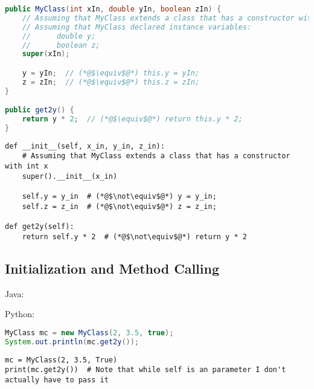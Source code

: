 \documentclass{article}
\begin{document}
\begin{minipage}{0.45\linewidth}
    \begin{lstlisting}[language=Java]
public MyClass(int xIn, double yIn, boolean zIn) {
    // Assuming that MyClass extends a class that has a constructor with int x
    // Assuming that MyClass declared instance variables:
    //      double y;
    //      boolean z;
    super(xIn);

    y = yIn;  // (*@$\equiv$@*) this.y = yIn;
    z = zIn;  // (*@$\equiv$@*) this.z = zIn;
}

public get2y() {
    return y * 2;  // (*@$\equiv$@*) return this.y * 2;
}
     \end{lstlisting}
\end{minipage}
\hfill
\begin{minipage}{0.45\linewidth}
    \begin{lstlisting}
def __init__(self, x_in, y_in, z_in):
    # Assuming that MyClass extends a class that has a constructor with int x
    super().__init__(x_in)

    self.y = y_in  # (*@$\not\equiv$@*) y = y_in;
    self.z = z_in  # (*@$\not\equiv$@*) z = z_in;

def get2y(self):
    return self.y * 2  # (*@$\not\equiv$@*) return y * 2
    \end{lstlisting}
\end{minipage}

\subsection{Initialization and Method Calling}
\begin{minipage}{0.45\linewidth}
    Java:
\end{minipage}
\hfill
\begin{minipage}{0.45\linewidth}
    Python:
\end{minipage}

\begin{minipage}{0.45\linewidth}
    \begin{lstlisting}[language=Java]
MyClass mc = new MyClass(2, 3.5, true);
System.out.println(mc.get2y());
     \end{lstlisting}
\end{minipage}
\hfill
\begin{minipage}{0.45\linewidth}
    \begin{lstlisting}
mc = MyClass(2, 3.5, True)
print(mc.get2y())  # Note that while self is an parameter I don't actually have to pass it
    \end{lstlisting}
\end{minipage}
\end{document}
